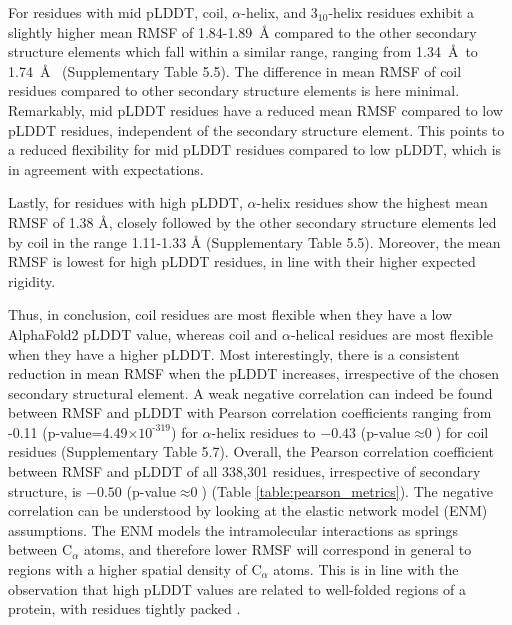 For residues with mid pLDDT, coil, $\alpha$-helix, and $3_{10}$-helix residues exhibit a slightly higher mean RMSF of 1.84-1.89~{\AA} compared to the other secondary structure elements which fall within a similar range, ranging from 1.34~\AA~to 1.74~\AA~ (Supplementary Table 5.5).
The difference in mean RMSF of coil residues compared to other secondary structure elements is here minimal. Remarkably, mid pLDDT residues have a reduced mean RMSF compared to low pLDDT residues, independent of the secondary structure element. This points to a reduced flexibility for mid pLDDT residues compared to low pLDDT, which is in agreement with expectations.

Lastly, for residues with high pLDDT, $\alpha$-helix residues show the highest mean RMSF of 1.38 {\AA}, closely followed by the other secondary structure elements led by coil in the range 1.11-1.33 {\AA} (Supplementary Table 5.5).
Moreover, the mean RMSF is lowest for high pLDDT residues, in line with their higher expected rigidity.

Thus, in conclusion, coil residues are most flexible when they have a low AlphaFold2 pLDDT value, whereas coil and $\alpha$-helical residues are most flexible when they have a higher pLDDT. Most interestingly, there is a consistent reduction in mean RMSF when the pLDDT increases, irrespective of the chosen secondary structural element. A weak negative correlation can indeed be found between RMSF and pLDDT with Pearson correlation coefficients ranging from -0.11 (p-value=4.49$\times\text{10}^{\text{-319}}$) for $\alpha$-helix residues to $-0.43$ (p-value$\approx\text{0}$) for coil residues (Supplementary Table 5.7).
Overall, the Pearson correlation coefficient between RMSF and pLDDT of all 338,301 residues, irrespective of secondary structure, is $-0.50$ (p-value$\approx\text{0}$) (Table \ref{table:pearson_metrics}).  The negative correlation can be understood by looking at the elastic network model (ENM) assumptions. The ENM models the intramolecular interactions as springs between C$_\alpha$ atoms, and  therefore lower RMSF will correspond in general to regions with a higher spatial density of C$_\alpha$ atoms. This is in line with the observation that high pLDDT values are related to well-folded regions of a protein, with residues tightly packed \cite{jumper_highly_2021}.  

